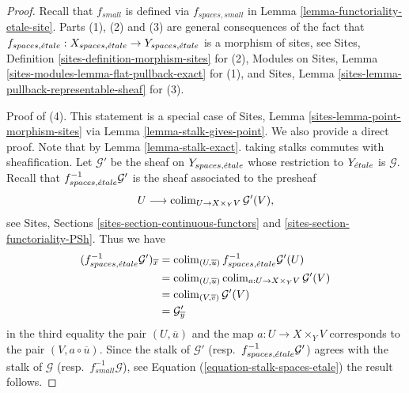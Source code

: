 \begin{proof}
Recall that $f_{small}$ is defined via $f_{spaces, small}$ in
Lemma \ref{lemma-functoriality-etale-site}.
Parts (1), (2) and (3) are general consequences of the fact that
$f_{spaces, {\acute{e}tale}} :
X_{spaces, {\acute{e}tale}}
\to
Y_{spaces, {\acute{e}tale}}$
is a morphism of sites, see
Sites, Definition \ref{sites-definition-morphism-sites}
for (2),
Modules on Sites, Lemma \ref{sites-modules-lemma-flat-pullback-exact}
for (1), and
Sites, Lemma \ref{sites-lemma-pullback-representable-sheaf}
for (3).

\medskip\noindent
Proof of (4). This statement is a special case of
Sites, Lemma \ref{sites-lemma-point-morphism-sites}
via
Lemma \ref{lemma-stalk-gives-point}.
We also provide a direct proof. Note that by
Lemma \ref{lemma-stalk-exact}.
taking stalks commutes with sheafification.
Let $\mathcal{G}'$ be the sheaf on $Y_{spaces, {\acute{e}tale}}$ whose restriction
to $Y_{\acute{e}tale}$ is $\mathcal{G}$.
Recall that $f_{spaces, {\acute{e}tale}}^{-1}\mathcal{G}'$ is the sheaf
associated to the presheaf
$$
U \longrightarrow \mathop{\mathrm{colim}}\nolimits_{U \to X \times_Y V} \mathcal{G}'(V),
$$
see
Sites, Sections \ref{sites-section-continuous-functors} and
\ref{sites-section-functoriality-PSh}.
Thus we have
\begin{align*}
(f_{spaces, {\acute{e}tale}}^{-1}\mathcal{G}')_{\overline{x}}
& =
\mathop{\mathrm{colim}}\nolimits_{(U, \overline{u})} f_{spaces, {\acute{e}tale}}^{-1}\mathcal{G}'(U)
\\
& = \mathop{\mathrm{colim}}\nolimits_{(U, \overline{u})}
\mathop{\mathrm{colim}}\nolimits_{a : U \to X \times_Y V} \mathcal{G}'(V) \\
& = \mathop{\mathrm{colim}}\nolimits_{(V, \overline{v})} \mathcal{G}'(V) \\
& = \mathcal{G}'_{\overline{y}}
\end{align*}
in the third equality the pair $(U, \overline{u})$ and the map
$a : U \to X \times_Y V$ corresponds to the pair $(V, a \circ \overline{u})$.
Since the stalk of $\mathcal{G}'$
(resp.\ $f_{spaces, {\acute{e}tale}}^{-1}\mathcal{G}'$)
agrees with the stalk of $\mathcal{G}$ (resp.\ $f_{small}^{-1}\mathcal{G}$),
see
Equation (\ref{equation-stalk-spaces-etale})
the result follows.
\end{proof}

